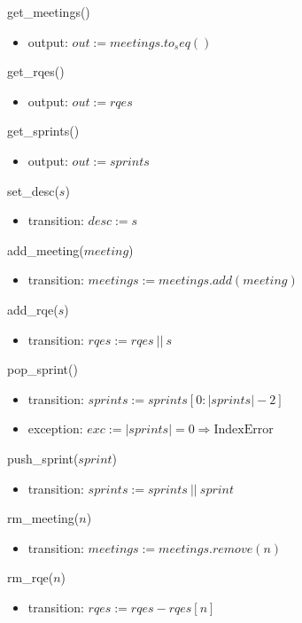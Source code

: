 \documentclass[12pt, titlepage]{article}
\begin{document}
\noindent get\_meetings()
\begin{itemize}
    \item output: $out := meetings.to_seq()$
\end{itemize}

\noindent get\_rqes()
\begin{itemize}
    \item output: $out := rqes$
\end{itemize}

\noindent get\_sprints()
\begin{itemize}
    \item output: $out := sprints$
\end{itemize}

\noindent set\_desc($s$)
\begin{itemize}
    \item transition: $desc := s$
\end{itemize}

\noindent add\_meeting($meeting$)
\begin{itemize}
    \item transition: $meetings := meetings.add(meeting)$
\end{itemize}

\noindent add\_rqe($s$)
\begin{itemize}
    \item transition: $rqes := rqes\ ||\ s$
\end{itemize}

\noindent pop\_sprint()
\begin{itemize}
    \item transition: $sprints := sprints[0: |sprints| - 2]$
    \item exception: $exc := |sprints| = 0 \Rightarrow \text{IndexError}$
\end{itemize}

\noindent push\_sprint($sprint$)
\begin{itemize}
    \item transition: $sprints := sprints\ ||\ sprint$
\end{itemize}

\noindent rm\_meeting($n$)
\begin{itemize}
    \item transition: $meetings := meetings.remove(n)$
\end{itemize}

\noindent rm\_rqe($n$)
\begin{itemize}
    \item transition: $rqes := rqes - rqes[n]$
\end{itemize}
\end{document}
